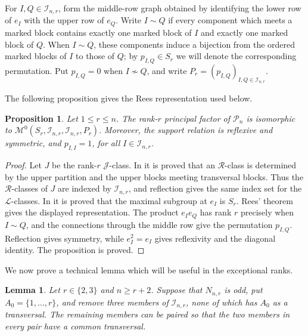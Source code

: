 \documentclass[11pt]{article}
\theoremstyle{plain}
\newtheorem{prop}[theorem]{Proposition}
\newtheorem{lemma}[theorem]{Lemma}
\theoremstyle{remark}
\theoremstyle{definition}
\theoremstyle{plain}
\begin{document}
For $I,Q\in\mathcal I_{n,r}$, form the middle-row graph obtained by
identifying the lower row of $e_I$ with the upper row of $e_Q$. Write
$I\sim Q$ if every component which meets a marked block contains exactly
one marked block of $I$ and exactly one marked block of $Q$. When
$I\sim Q$, these components induce a bijection from the ordered marked
blocks of $I$ to those of $Q$; by $p_{I,Q}\in S_r$ we will denote the
corresponding permutation. Put $p_{I,Q}=0$ when $I\nsim Q$, and write
$P_r=(p_{I,Q})_{I,Q\in\mathcal I_{n,r}}$.

The following proposition gives the Rees representation used below.

\begin{prop}\label{p:partition-Rees-data}
Let $1\le r\le n$. The rank-$r$ principal factor of $\mathcal P_n$ is
isomorphic to
\(\mathcal M^0(S_r,\mathcal I_{n,r},\mathcal I_{n,r},P_r).\)
Moreover, the support relation is reflexive and symmetric, and
$p_{I,I}=1$, for all $I\in\mathcal I_{n,r}$.
\end{prop}

\begin{proof}
Let $J$ be the rank-$r$ $\mathcal J$-class. In
\cite[Proposition~2.1]{EastMitchellRuskucTorpey} it is proved that an
$\mathcal R$-class is determined by the upper partition and the upper blocks
meeting transversal blocks. Thus the $\mathcal R$-classes of $J$ are
indexed by $\mathcal I_{n,r}$, and reflection gives the same index set for
the $\mathcal L$-classes. In
\cite[Remark~2.2(vii)]{EastMitchellRuskucTorpey} it is proved that the
maximal subgroup at $e_I$ is $S_r$. Rees' theorem gives the displayed
representation. The product $e_Ie_Q$ has rank $r$ precisely when
$I\sim Q$, and the connections through the middle row give the permutation
$p_{I,Q}$. Reflection gives symmetry, while $e_I^2=e_I$ gives reflexivity
and the diagonal identity. The proposition is proved.
\end{proof}

We now prove a technical lemma which will be useful in the exceptional
ranks.

\begin{lemma}\label{l:marked-partition-pairing}
Let $r\in\{2,3\}$ and $n\ge r+2$. Suppose that $N_{n,r}$ is odd, put
$A_0=\{1,\ldots,r\}$, and remove three members of
$\mathcal I_{n,r}$, none of which has $A_0$ as a transversal. The remaining
members can be paired so that the two members in every pair have a common
transversal.
\end{lemma}
\end{document}
